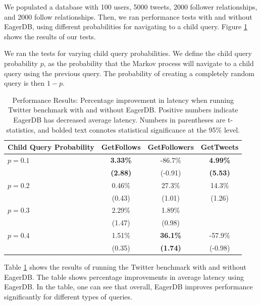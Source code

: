 \documentclass[12pt]{article}
\begin{document}
We populated a database with 100 users, 5000 tweets, 2000 follower relationships, and 2000 follow relationships. Then, we ran performance tests with and without EagerDB, using different probabilities for navigating to a child query. Figure \ref{fig:performance-results} shows the results of our tests.

We ran the tests for varying child query probabilities. We define the child query probability $p$, as the probability that the Markov process will navigate to a child query using the previous query. The probability of creating a completely random query is then $1-p$.

\begin{table}[h]
  \centering
  \begin{tabular}{l | c c c }
    Child Query Probability & GetFollows      & GetFollowers    & GetTweets \\
    \hline \hline
                  $p = 0.1$ & \textbf{3.33\%} & -86.7\%         & \textbf{4.99\%} \\
                            & \textbf{(2.88)} & (-0.91)         & \textbf{(5.53)} \\
                  $p = 0.2$ & 0.46\%          & 27.3\%          & 14.3\% \\
                            & (0.43)          & (1.01)          & (1.26) \\
                  $p = 0.3$ & 2.29\%          & 1.89\%          &        \\
                            & (1.47)          & (0.98)          &        \\
                  $p = 0.4$ & 1.51\%          & \textbf{36.1\%} & -57.9\% \\
                            & (0.35)          & \textbf{(1.74)} & (-0.98)
  \end{tabular}
  \caption{\label{fig:performance-results}Performance Results: Percentage improvement in latency when running Twitter benchmark with and without EagerDB. Positive numbers indicate EagerDB has decreased average latency. Numbers in parentheses are t-statistics, and bolded text connotes statistical significance at the 95\% level.}
\end{table}

Table \ref{fig:performance-results} shows the results of running the Twitter benchmark with and without EagerDB. The table shows percentage improvements in average latency using EagerDB. In the table, one can see that overall, EagerDB improves performance significantly for different types of queries. 
\end{document}
